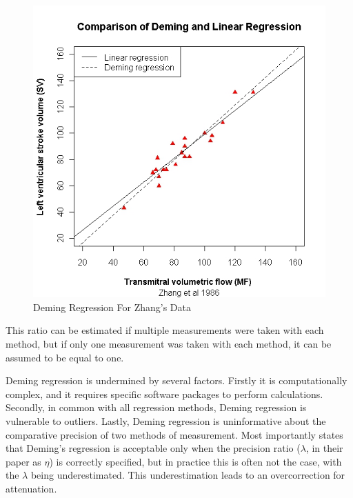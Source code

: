 \documentclass[12pt, a4paper]{report}
\theoremstyle{plain}
\theoremstyle{definition}
\theoremstyle{remark}
\begin{document}
\begin{figure}[h!]
	\includegraphics[width=130mm]{images/ZhangDeming.jpeg}
	\caption{Deming Regression For Zhang's Data}\label{ZhangDeming}
\end{figure}








This ratio can be estimated if multiple measurements were taken with each method, but if only one measurement was taken with each method, it can be assumed to be equal to one.





Deming regression is undermined by several factors. Firstly it is computationally complex, and it requires specific software packages to perform calculations. Secondly, in common with all regression methods, Deming regression is vulnerable to outliers. Lastly, Deming regression is uninformative about the comparative precision of two methods of measurement. Most importantly \citet{CarollRupert} states that Deming's regression is acceptable only when the precision ratio ($\lambda$, in their paper as $\eta$) is correctly specified, but in practice this is often not the case, with the $\lambda$ being underestimated. This underestimation leads to an overcorrection for attenuation.
\end{document}
